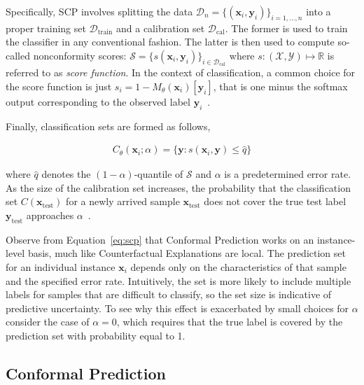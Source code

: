 \documentclass{article}
\begin{document}
Specifically, SCP involves splitting the data $\mathcal{D}_n=\{(\mathbf{x}_i,\mathbf{y}_i)\}_{i=1,...,n}$ into a proper training set $\mathcal{D}_{\text{train}}$ and a calibration set $\mathcal{D}_{\text{cal}}$. The former is used to train the classifier in any conventional fashion. The latter is then used to compute so-called nonconformity scores: $\mathcal{S}=\{s(\mathbf{x}_i,\mathbf{y}_i)\}_{i \in \mathcal{D}_{\text{cal}}}$ where $s: (\mathcal{X},\mathcal{Y}) \mapsto \mathbb{R}$ is referred to as \textit{score function}. In the context of classification, a common choice for the score function is just $s_i=1-M_{\theta}(\mathbf{x}_i)[\mathbf{y}_i]$, that is one minus the softmax output corresponding to the observed label $\mathbf{y}_i$~\citep{angelopoulos2021gentle}. 

Finally, classification sets are formed as follows,

\begin{equation}\label{eq:scp}
  \begin{aligned}
    C_{\theta}(\mathbf{x}_i;\alpha)=\{\mathbf{y}: s(\mathbf{x}_i,\mathbf{y}) \le \hat{q}\}
  \end{aligned}
\end{equation}

where $\hat{q}$ denotes the $(1-\alpha)$-quantile of $\mathcal{S}$ and $\alpha$ is a predetermined error rate. As the size of the calibration set increases, the probability that the classification set $C(\mathbf{x}_{\text{test}})$ for a newly arrived sample $\mathbf{x}_{\text{test}}$ does not cover the true test label $\mathbf{y}_{\text{test}}$ approaches $\alpha$~\citep{angelopoulos2021gentle}. 

Observe from Equation~\ref{eq:scp} that Conformal Prediction works on an instance-level basis, much like Counterfactual Explanations are local. The prediction set for an individual instance $\mathbf{x}_i$ depends only on the characteristics of that sample and the specified error rate. Intuitively, the set is more likely to include multiple labels for samples that are difficult to classify, so the set size is indicative of predictive uncertainty. To see why this effect is exacerbated by small choices for $\alpha$ consider the case of $\alpha=0$, which requires that the true label is covered by the prediction set with probability equal to 1.

\subsection{Conformal Prediction}\label{app:eccco}
\end{document}
